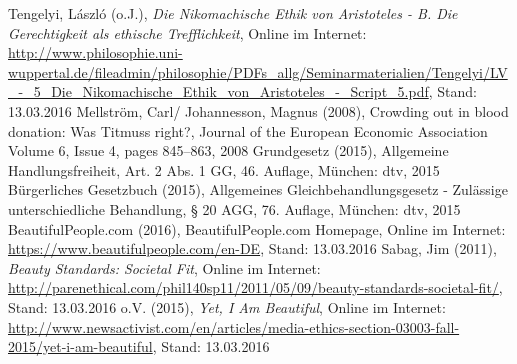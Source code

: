 \documentclass[a4paper, fontsize=12pt, parskip=full, toc=bibliographynumbered]{scrreprt}
\begin{document}
\renewcommand{\bibname}{Quellenverzeichnis}
\begin{thebibliography}{9}
 Tengelyi, László (o.J.), \emph{Die Nikomachische Ethik von Aristoteles - B. Die Gerechtigkeit als ethische Trefflichkeit}, Online im Internet: \url{http://www.philosophie.uni-wuppertal.de/fileadmin/philosophie/PDFs_allg/Seminarmaterialien/Tengelyi/LV_-_5_Die_Nikomachische_Ethik_von_Aristoteles_-_Script_5.pdf}, Stand: 13.03.2016
 Mellström, Carl/ Johannesson, Magnus (2008), Crowding out in blood donation: Was Titmuss right?, Journal of the European Economic Association Volume 6, Issue 4, pages 845–863, 2008
 Grundgesetz (2015), Allgemeine Handlungsfreiheit, Art. 2 Abs. 1 GG, 46. Auflage, München: dtv, 2015
 Bürgerliches Gesetzbuch (2015), Allgemeines Gleichbehandlungsgesetz - Zulässige unterschiedliche Behandlung, § 20 AGG, 76. Auflage, München: dtv,  2015
 BeautifulPeople.com (2016), BeautifulPeople.com Homepage, Online im Internet: \url{https://www.beautifulpeople.com/en-DE}, Stand: 13.03.2016
 Sabag, Jim (2011), \emph{Beauty Standards: Societal Fit}, Online im Internet: \url{http://parenethical.com/phil140sp11/2011/05/09/beauty-standards-societal-fit/}, Stand: 13.03.2016
 o.V. (2015), \emph{Yet, I Am Beautiful}, Online im Internet: \url{http://www.newsactivist.com/en/articles/media-ethics-section-03003-fall-2015/yet-i-am-beautiful}, Stand: 13.03.2016
\end{thebibliography}
\end{document}
